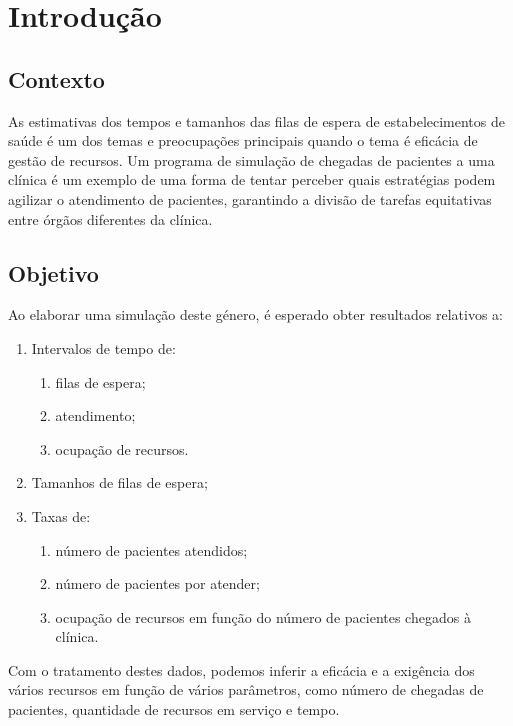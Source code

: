 \documentclass[12pt,a4paper]{article} %
\begin{document}
    \section{Introdução}

    \subsection{Contexto}

    As estimativas dos tempos e tamanhos das filas de espera de estabelecimentos de saúde é um dos temas e preocupações principais quando o tema é eficácia de gestão de recursos. Um programa de simulação de chegadas de pacientes a uma clínica é um exemplo de uma forma de tentar perceber quais estratégias podem agilizar o atendimento de pacientes, garantindo a divisão de tarefas equitativas entre órgãos diferentes da clínica. 

    \subsection{Objetivo}

    Ao elaborar uma simulação deste género, é esperado obter resultados relativos a:
    \begin{enumerate}
        \item Intervalos de tempo de:
        \begin{enumerate}
            \item[1.1]filas de espera;
            \item[1.2] atendimento;
            \item[1.3] ocupação de recursos.
        \end{enumerate}
        \item Tamanhos de filas de espera;
        \item Taxas de:
            \begin{enumerate}
                \item[3.1]número de pacientes atendidos;
                \item[3.2]número de pacientes por atender;
                \item[3.3]ocupação de recursos em função do número de pacientes chegados à clínica.
            \end{enumerate}
    \end{enumerate}

    \medskip
    Com o tratamento destes dados, podemos inferir a eficácia e a exigência dos vários recursos em função de vários parâmetros, como número de chegadas de pacientes, quantidade de recursos em serviço e tempo.
\end{document}
